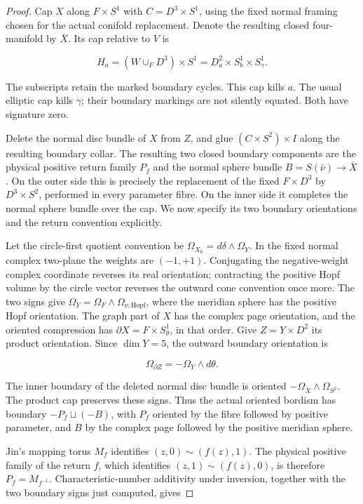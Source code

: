 \begin{proof}
Cap \(X\) along \(F\times S^1\) with \(C=D^3\times S^1\), using
the fixed normal framing chosen for the actual conifold replacement.
Denote the resulting closed four-manifold by \(\bar X\).  Its cap
relative to \(V\) is

\[
 H_a=(W\cup_FD^3)\times S^1
      =D^2_a\times S^1_b\times S^1_\gamma.
\]

The subscripts retain the marked boundary cycles.  This cap kills
\(a\).  The usual elliptic cap kills \(\gamma\); their boundary
markings are not silently equated.  Both have signature zero.

Delete the normal disc bundle of \(X\) from \(Z\), and glue
\((C\times S^2)\times I\) along the resulting boundary collar.
The resulting two closed boundary components are the physical
positive return family \(P_f\) and the normal sphere bundle
\(B=S(\bar\nu)\to\bar X\).  On the outer side this is precisely
the replacement of the fixed \(F\times D^3\) by \(D^3\times S^2\),
performed in every parameter fibre.  On the inner side it completes
the normal sphere bundle over the cap.  We now specify its two
boundary orientations and the return convention explicitly.

Let the circle-first quotient convention be
\(\Omega_{X_6}=d\delta\wedge\Omega_Y\).  In the fixed normal
complex two-plane the weights are \((-1,+1)\).  Conjugating the
negative-weight complex coordinate reverses its real orientation;
contracting the positive Hopf volume by the circle vector reverses
the outward cone convention once more.  The two signs give
\(\Omega_Y=\Omega_F\wedge\Omega_{\nu,\mathrm{Hopf}}\), where
the meridian sphere has the positive Hopf orientation.  The graph
part of \(X\) has the complex page orientation, and the oriented
compression has \(\partial X=F\times S^1_\theta\), in that order.
Give \(Z=Y\times D^2\) its product orientation.  Since \(\dim Y=5\),
the outward boundary orientation is

\[
 \Omega_{\partial Z}=-\Omega_Y\wedge d\theta.
\]

The inner boundary of the deleted normal disc bundle is oriented
\(-\Omega_{\bar X}\wedge\Omega_{S^2}\).  The product cap preserves
these signs.  Thus the actual oriented bordism has boundary
\(-P_f\sqcup(-B)\), with \(P_f\) oriented by the fibre followed
by positive parameter, and \(B\) by the complex page followed
by the positive meridian sphere.

Jin's mapping torus \(M_f\) identifies \((z,0)\sim(f(z),1)\).
The physical positive family of the return \(f\), which identifies
\((z,1)\sim(f(z),0)\), is therefore \(P_f=M_{f^{-1}}\).
Characteristic-number additivity under inversion, together with
the two boundary signs just computed, gives


\end{proof}
